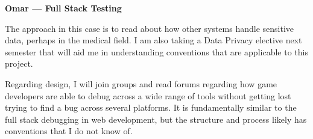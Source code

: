 \documentclass[12pt, titlepage]{article}
\begin{document}
\begin{enumerate}
\textbf{Omar --- Full Stack Testing}

The approach in this case is to read about how other systems handle sensitive data, perhaps in the medical field. I am also taking a Data Privacy elective next semester that will aid me in understanding conventions that are applicable to this project.

Regarding design, I will join groups and read forums regarding how game developers are able to debug across a wide range of tools without getting lost trying to find a bug across several platforms. It is fundamentally similar to the full stack debugging in web development, but the structure and process likely has conventions that I do not know of.

\end{enumerate}
\end{document}
